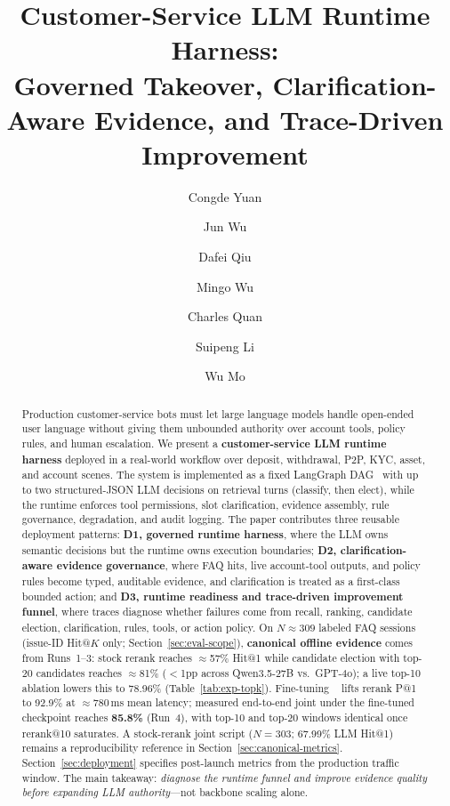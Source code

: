 \documentclass[sigconf,review]{acmart}
\title{Customer-Service LLM Runtime Harness:\\
Governed Takeover, Clarification-Aware Evidence, and Trace-Driven Improvement}
\author{Congde Yuan}
\affiliation{%
  \city{Shenzhen}
  \country{China}
}
\author{Jun Wu}
\affiliation{%
  \city{Shenzhen}
  \country{China}
}
\author{Dafei Qiu}
\affiliation{%
  \city{Shenzhen}
  \country{China}
}
\author{Mingo Wu}
\affiliation{%
  \city{Shenzhen}
  \country{China}
}
\author{Charles Quan}
\affiliation{%
  \city{Shenzhen}
  \country{China}
}
\author{Suipeng Li}
\affiliation{%
  \city{Shenzhen}
  \country{China}
}
\author{Wu Mo}
\affiliation{%
  \city{Shenzhen}
  \country{China}
}
\newcommand{\code}[1]{\texttt{\seqsplit{#1}}}
\begin{document}
\begin{abstract}
Production customer-service bots must let large language models handle open-ended user language without giving them unbounded authority over account tools, policy rules, and human escalation. We present a \textbf{customer-service LLM runtime harness} deployed in a real-world workflow over deposit, withdrawal, P2P, KYC, asset, and account scenes. The system is implemented as a fixed LangGraph DAG~\cite{langgraph2024} with up to two structured-JSON LLM decisions on retrieval turns (classify, then elect), while the runtime enforces tool permissions, slot clarification, evidence assembly, rule governance, degradation, and audit logging. The paper contributes three reusable deployment patterns: \textbf{D1, governed runtime harness}, where the LLM owns semantic decisions but the runtime owns execution boundaries; \textbf{D2, clarification-aware evidence governance}, where FAQ hits, live account-tool outputs, and policy rules become typed, auditable evidence, and clarification is treated as a first-class bounded action; and \textbf{D3, runtime readiness and trace-driven improvement funnel}, where traces diagnose whether failures come from recall, ranking, candidate election, clarification, rules, tools, or action policy.
On $N{\approx}309$ labeled FAQ sessions (issue-ID Hit@$K$ only; Section~\ref{sec:eval-scope}), \textbf{canonical offline evidence} comes from Runs~1--3: stock rerank reaches $\approx$57\% Hit@1 while candidate election with top-20 candidates reaches $\approx$81\% ($<$1pp across Qwen3.5-27B vs.\ GPT-4o); a live top-10 ablation lowers this to 78.96\% (Table~\ref{tab:exp-topk}). Fine-tuning \code{bge-reranker-large}~\cite{xiao2024bge} lifts rerank P@1 to 92.9\% at $\approx$780\,ms mean latency; measured end-to-end joint under the fine-tuned checkpoint reaches \textbf{85.8\%} (Run~4), with top-10 and top-20 windows identical once rerank@10 saturates. A stock-rerank joint script ($N{=}303$; 67.99\% LLM Hit@1) remains a reproducibility reference in Section~\ref{sec:canonical-metrics}. Section~\ref{sec:deployment} specifies post-launch metrics from the production traffic window. The main takeaway: \emph{diagnose the runtime funnel and improve evidence quality before expanding LLM authority}---not backbone scaling alone.
\end{abstract}


\maketitle
\end{document}
